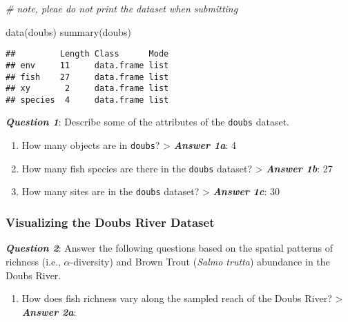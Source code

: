 \documentclass[
]{article}
\newenvironment{Shaded}{\begin{snugshade}}{\end{snugshade}}
\newcommand{\CommentTok}[1]{\textcolor[rgb]{0.56,0.35,0.01}{\textit{#1}}}
\newcommand{\FunctionTok}[1]{\textcolor[rgb]{0.00,0.00,0.00}{#1}}
\newcommand{\NormalTok}[1]{#1}
\providecommand{\tightlist}{%
  \setlength{\itemsep}{0pt}\setlength{\parskip}{0pt}}
\begin{document}
\begin{Shaded}
\begin{Highlighting}[]
\CommentTok{\# note, pleae do not print the dataset when submitting}

\FunctionTok{data}\NormalTok{(doubs)}
\FunctionTok{summary}\NormalTok{(doubs)}
\end{Highlighting}
\end{Shaded}

\begin{verbatim}
##         Length Class      Mode
## env     11     data.frame list
## fish    27     data.frame list
## xy       2     data.frame list
## species  4     data.frame list
\end{verbatim}

\textbf{\emph{Question 1}}: Describe some of the attributes of the
\texttt{doubs} dataset.

\begin{enumerate}
\def\labelenumi{\alph{enumi}.}
\item
  How many objects are in \texttt{doubs}? \textgreater{}
  \textbf{\emph{Answer 1a}}: 4
\item
  How many fish species are there in the \texttt{doubs} dataset?
  \textgreater{} \textbf{\emph{Answer 1b}}: 27
\item
  How many sites are in the \texttt{doubs} dataset? \textgreater{}
  \textbf{\emph{Answer 1c}}: 30
\end{enumerate}

\hypertarget{visualizing-the-doubs-river-dataset}{%
\subsubsection{Visualizing the Doubs River
Dataset}\label{visualizing-the-doubs-river-dataset}}

\textbf{\emph{Question 2}}: Answer the following questions based on the
spatial patterns of richness (i.e., \(\alpha\)-diversity) and Brown
Trout (\emph{Salmo trutta}) abundance in the Doubs River.

\begin{enumerate}
\def\labelenumi{\alph{enumi}.}
\tightlist
\item
  How does fish richness vary along the sampled reach of the Doubs
  River? \textgreater{} \textbf{\emph{Answer 2a}}:
\end{enumerate}
\end{document}
